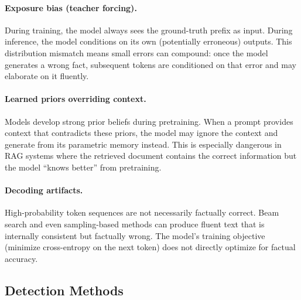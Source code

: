 \paragraph{Exposure bias (teacher forcing).}
During training, the model always sees the ground-truth prefix as input.
During inference, the model conditions on its own (potentially erroneous)
outputs.  This distribution mismatch means small errors can compound: once
the model generates a wrong fact, subsequent tokens are conditioned on that
error and may elaborate on it fluently.

\paragraph{Learned priors overriding context.}
Models develop strong prior beliefs during pretraining.  When a prompt
provides context that contradicts these priors, the model may ignore the
context and generate from its parametric memory instead.  This is especially
dangerous in RAG systems where the retrieved document contains the correct
information but the model ``knows better'' from pretraining.

\paragraph{Decoding artifacts.}
High-probability token sequences are not necessarily factually correct.
Beam search and even sampling-based methods can produce fluent text that
is internally consistent but factually wrong.  The model's training
objective (minimize cross-entropy on the next token) does not directly
optimize for factual accuracy.

\subsection{Detection Methods}

